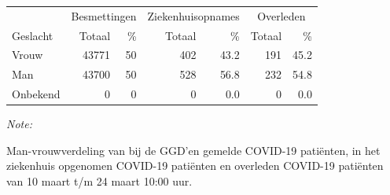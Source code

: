 \documentclass[
  english,
  man,floatsintext]{apa6}
\begin{document}
\begin{table}
\centering\begingroup\fontsize{11}{13}\selectfont

\begin{threeparttable}
\begin{tabular}{lrrrrrr}
\toprule
\multicolumn{1}{c}{ } & \multicolumn{2}{c}{Besmettingen} & \multicolumn{2}{c}{Ziekenhuisopnames} & \multicolumn{2}{c}{Overleden} \\
\cmidrule(l{3pt}r{3pt}){2-3} \cmidrule(l{3pt}r{3pt}){4-5} \cmidrule(l{3pt}r{3pt}){6-7}
Geslacht & Totaal & \% & Totaal & \% & Totaal & \%\\
\midrule
Vrouw & 43771 & 50 & 402 & 43.2 & 191 & 45.2\\
Man & 43700 & 50 & 528 & 56.8 & 232 & 54.8\\
Onbekend & 0 & 0 & 0 & 0.0 & 0 & 0.0\\
\bottomrule
\end{tabular}
\begin{tablenotes}
\item \textit{Note: } 
\item Man-vrouwverdeling van bij de GGD’en gemelde COVID-19 patiënten, in het ziekenhuis opgenomen COVID-19 patiënten en overleden COVID-19 patiënten van 10 maart t/m 24 maart 10:00 uur.
\end{tablenotes}
\end{threeparttable}
\endgroup{}
\end{table}
\newpage
\end{document}
